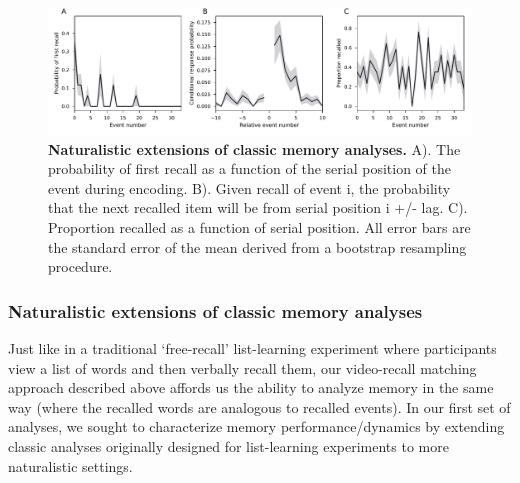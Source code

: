 \documentclass{article}
\begin{document}
{\begin{figure}[t!]
\centering
\includegraphics[width=1\textwidth]{figs/3_list_learning.pdf}
\caption{\small \textbf{Naturalistic extensions of classic memory analyses.} A). The probability of first recall as a function of the serial position of the event during encoding. B). Given recall of event i, the probability that the next recalled item will be from serial position i +/- lag. C). Proportion recalled as a function of serial position. All error bars are the standard error of the mean derived from a bootstrap resampling procedure.}
\label{fig:list-learning}
\end{figure}

\subsubsection{Naturalistic extensions of classic memory analyses}
Just like in a traditional `free-recall' list-learning experiment where participants view a list of words and then verbally recall them, our video-recall matching approach described above affords us the ability to analyze memory in the same way (where the recalled words are analogous to recalled events). In our first set of analyses, we sought to characterize memory performance/dynamics by extending classic analyses originally designed for list-learning experiments to more naturalistic settings.

}
\end{document}
